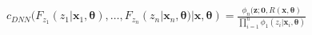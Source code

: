 \documentclass[preview]{standalone}
\begin{document}
\begin{center}
$c_{DNN}$$(F_{z_1}(z_1 | \boldsymbol{x}_1, \boldsymbol{\theta}), \ldots,  F_{z_n}(z_n | \boldsymbol{x}_n, \boldsymbol{\theta})| \boldsymbol{x}, \boldsymbol{\theta})$$ = $$\frac{\phi_n(\boldsymbol{z}; \boldsymbol{0}, R(\boldsymbol{x}, \boldsymbol{\theta})}{\prod_{i=1}^n \phi_{1}(z_i| \boldsymbol{x}_i, \boldsymbol{\theta})}$
\end{center}
\end{document}
